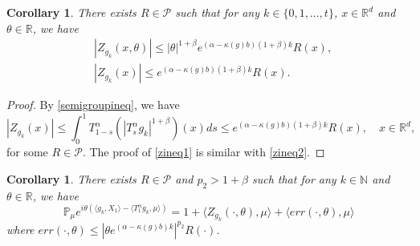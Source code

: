 \documentclass[12pt, a4paper]{amsart}
\newtheorem{cor}[thm]{Corollary}
\theoremstyle{definition}
\numberwithin{equation}{section}
\begin{document}
\begin{cor}\label{corollary2}
  There exists $R \in \mathcal{P}$ such that for any $k\in\{0,1,...,t\}$, $x\in \mathbb{R}^d$ and $\theta\in \mathbb{R}$, we have 
  \begin{align}
       &|Z_{g_k}(x,\theta)|\leq |\theta|^{1+\beta}e^{(\alpha-\kappa(g)b)(1+\beta)k}R(x) \label{zineq1},\\
       &|Z_{g_k}(x)|\leq e^{(\alpha-\kappa(g)b)(1+\beta)k}R(x). \label{zineq2}
  \end{align}
  \end{cor}
  
\begin{proof}
     By \eqref{semigroupineq}, we have
   $$|Z_{g_k}(x)|\leq \int_0^1 T_{1-s}^{\alpha}(|T_s^{\alpha}g_k|^{1+\beta})(x)ds\leq  e^{(\alpha-\kappa(g)b)(1+\beta)k}R(x), \quad x\in \mathbb{R}^d,$$
   for some $R\in \mathcal{P}$. The proof of \eqref{zineq1} is similar with \eqref{zineq2}.
\end{proof}


\begin{cor}\label{corollary1}
There exists $R \in \mathcal{P}$ and $p_2 >1+\beta$ such that for any $k \in \mathbb{N}$ and $\theta \in \mathbb{R}$, we have 
$$\mathbb{P}_{\mu}e^{i\theta(\langle g_k, X_1\rangle-\langle T_1^{\alpha}g_k,\mu \rangle)}=1+\langle Z_{g_k}(\cdot,\theta),\mu\rangle+\langle err(\cdot,\theta),\mu\rangle$$
where $err(\cdot,\theta)\leq |\theta e^{(\alpha-\kappa(g)b)k}|^{p_2}R(\cdot)$.
\end{cor}
\end{document}

